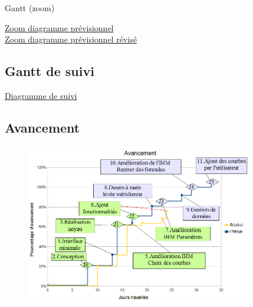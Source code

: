 \documentclass[xcolor=dvipsnames]{beamer}
\begin{document}
	
	\begin{frame}{Gantt (zoom)}
		\begin{center}
			\href{run:Images/GantInitialClasses.gif}{Zoom diagramme pr\'evisionnel}\\
			\bigskip
			\href{run:Images/GantReferenceClasses.gif}{Zoom diagramme prévisionnel révisé}
		\end{center}
	\end{frame}

	
	\subsection{Gantt de suivi}
	\begin{frame}{\subsecname}
		\begin{center}
			\href{run:Images/Gantt_ProjetDiscretSuivi2.gif}{Diagramme de suivi}
		\end{center}
	\end{frame}


	\subsection{Avancement}
	\begin{frame}{\subsecname}
		\begin{figure}
			\includegraphics[height=7cm]{Images/Avancement.png}
		\end{figure}
	\end{frame}
\end{document}
